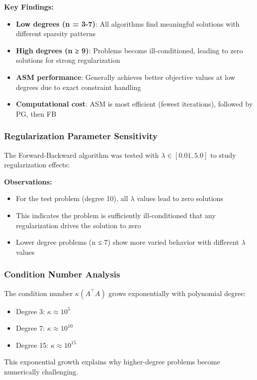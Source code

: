 \documentclass[11pt,a4paper]{article}
\begin{document}
\textbf{Key Findings:}
\begin{itemize}
    \item \textbf{Low degrees (n = 3-7)}: All algorithms find meaningful solutions with different sparsity patterns
    \item \textbf{High degrees (n ≥ 9)}: Problems become ill-conditioned, leading to zero solutions for strong regularization
    \item \textbf{ASM performance}: Generally achieves better objective values at low degrees due to exact constraint handling
    \item \textbf{Computational cost}: ASM is most efficient (fewest iterations), followed by PG, then FB
\end{itemize}

\subsubsection{Regularization Parameter Sensitivity}

The Forward-Backward algorithm was tested with $\lambda \in [0.01, 5.0]$ to study regularization effects:

\textbf{Observations:}
\begin{itemize}
    \item For the test problem (degree 10), all $\lambda$ values lead to zero solutions
    \item This indicates the problem is sufficiently ill-conditioned that any regularization drives the solution to zero
    \item Lower degree problems (n ≤ 7) show more varied behavior with different $\lambda$ values
\end{itemize}

\subsubsection{Condition Number Analysis}

The condition number $\kappa(A^\top A)$ grows exponentially with polynomial degree:
\begin{itemize}
    \item Degree 3: $\kappa \approx 10^5$
    \item Degree 7: $\kappa \approx 10^{10}$
    \item Degree 15: $\kappa \approx 10^{15}$
\end{itemize}

This exponential growth explains why higher-degree problems become numerically challenging.
\end{document}
